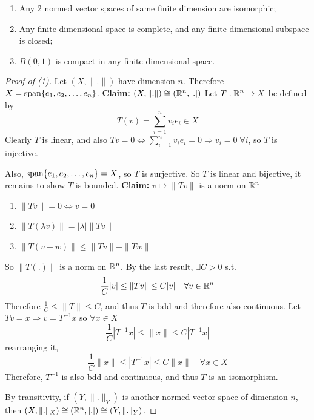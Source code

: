 \begin{cor}
    \begin{enumerate}
        \item Any 2 normed vector spaces of same finite dimension are isomorphic;
        \item Any finite dimensional space is complete, and any finite dimensional subspace
        is closed;
        \item $\overline{B(0, 1)} $ is compact in any finite dimensional space. 
    \end{enumerate}
\end{cor}
\begin{proof}[Proof of (1)]
    Let $(X, \| . \| )$ have dimension $n$. Therefore $X = \operatorname{span}\{e_1, e_2, \dots, e_n \}$.
    \newline\noindent \textbf{Claim:} $(X, \| . \| ) \cong (\mathbb{R}^n, | . | )$
    \newline \noindent Let $T : \mathbb{R}^n \to X$ be defined by
    \[
        T(v) = \sum_{i = 1}^n v_i e_i \in X
    \]    
    Clearly $T$ is linear, and also $Tv = 0 \iff \sum_{i = 1}^n v_i e_i = 0 
    \Rightarrow v_i = 0 \; \forall i$, so $T$ is injective.

    Also, $\operatorname{span} \{ e_1, e_2, \dots, e_n \} = X$, so $T$ is surjective. So $T$ is linear and 
    bijective, it remains to show $T$ is bounded.
    \newline\noindent \textbf{Claim:} $v \mapsto \| T v \| $ is a norm on $\mathbb{R}^n$
    \begin{enumerate}
        \item $\| T v\| = 0 \iff v = 0 $
        \item $\| T (\lambda v) \| = |\lambda| \| T v \| $
        \item $\| T (v + w) \| \leq \| T v \| + \| T w \| $     
    \end{enumerate}  
    So $\| T(.) \| $ is a norm on $\mathbb{R}^n$. By the last result, $\exists C > 0$ s.t.
    \[
        \frac{1}{C} | v| \leq \| T v \| \leq C | v | \quad \forall v \in \mathbb{R}^n 
    \]    
    Therefore $\frac{1}{C} \leq \|  T \| \leq C$, and thus $T$ is bdd and therefore also continuous.
    Let $T v = x \Rightarrow v = T^{-1}x$ so $\forall x \in X$ 
    \[
        \frac{1}{C} |T^{-1}x | \leq \| x \| \leq C |T^{-1}x|
    \]  
    rearranging it,
    \[
        \frac{1}{C} \| x \| \leq |T^{-1}x| \leq C \| x \| \quad \forall x \in X
    \] 
    Therefore, $T^{-1}$ is also bdd and continuous, and thus $T$ is an isomorphism.    

    By transitivity, if $(Y, \| . \|_Y )$ is another normed vector space of dimension $n$, 
    then $(X, \| . \|_X ) \cong 
    (\mathbb{R}^n, | . | ) \cong (Y, \| . \|_Y )$.
\end{proof}


